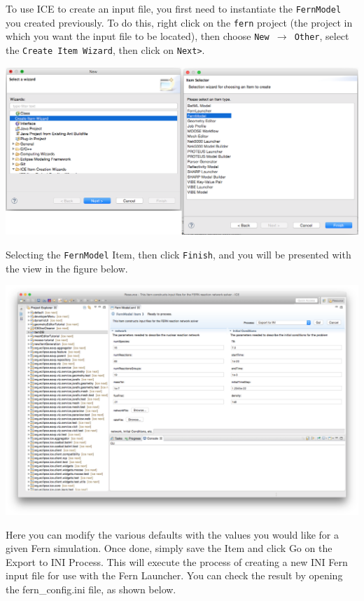 To use ICE to create an input file, you first need to instantiate the
\texttt{FernModel} you created previously. To do this, right click on the
\texttt{fern} project (the project in which you want the input file to be
located), then choose \texttt{New $\rightarrow$ Other},  select the
\texttt{Create Item Wizard}, then click on \texttt{Next>}.
\begin{center} \includegraphics[width=\textwidth]{figures/creatingFernModelItem}
\end{center}
Selecting the \texttt{FernModel} Item, then click \texttt{Finish}, and you will
be presented with the view in the figure below. 
\begin{center} \includegraphics[width=\textwidth]{figures/fernmodelItem}
\end{center}
Here you can modify the various defaults with the values you would like for a
given Fern simulation. Once done, simply save the Item and click Go on the
Export to INI Process. This will execute the process of creating a new INI Fern
input file for use with the Fern Launcher. You can check the result by opening
the fern\_config.ini file, as shown below. 
